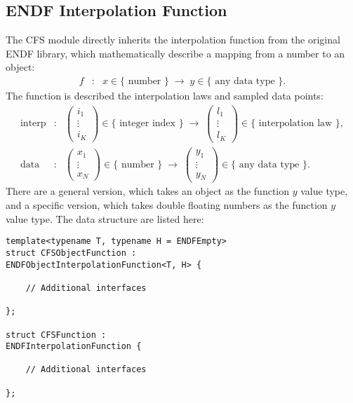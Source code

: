 \subsection{ENDF Interpolation Function}
The CFS module directly inherits the interpolation function from the original ENDF library, which mathematically describe a mapping from a number to an object:
\begin{eqnarray}
f &:& x\in\{\mbox{ number }\}\;\to\;y\in\{\mbox{ any data type }\}.
\end{eqnarray}
The function is described the interpolation laws and sampled data points:
\begin{eqnarray}
\mbox{interp} &:& 
\left(
\begin{array}{c}
i_1\\
\vdots\\
i_K
\end{array}
\right)\in\{\mbox{ integer index }\}
\;\to\;
\left(
\begin{array}{c}
l_1\\
\vdots\\
l_K
\end{array}
\right)\in\{\mbox{ interpolation law }\}, \\
\mbox{data} &:& 
\left(
\begin{array}{c}
x_1\\
\vdots\\
x_N
\end{array}
\right)\in\{\mbox{ number }\}
\;\to\;
\left(
\begin{array}{c}
y_1\\
\vdots\\
y_N
\end{array}
\right)\in\{\mbox{ any data type }\}.
\end{eqnarray}
There are a general version, which takes an object as the function $y$ value type, and a specific version, which takes double floating numbers as the function $y$ value type. The data structure are listed here:
\begin{verbatim}
template<typename T, typename H = ENDFEmpty>
struct CFSObjectFunction : 
ENDFObjectInterpolationFunction<T, H> {
    
    // Additional interfaces
    
};

struct CFSFunction : 
ENDFInterpolationFunction {
    
    // Additional interfaces
    
};
\end{verbatim}

